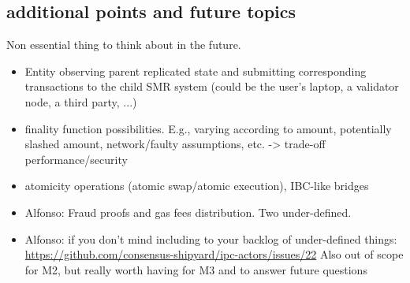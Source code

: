 \subsection{additional points and future topics}
Non essential thing to think about in the future.
\begin{itemize}
    \item Entity observing parent replicated state and submitting corresponding transactions to the child SMR system (could be the user's laptop, a validator node, a third party, ...)
    \item finality function possibilities. E.g., varying according to amount, potentially slashed amount, network/faulty assumptions, etc. -> trade-off performance/security
    \item atomicity operations (atomic swap/atomic execution), IBC-like bridges 
    \item Alfonso: Fraud proofs and gas fees distribution. Two under-defined.
    \item Alfonso: if you don't mind including to your backlog of under-defined things: \url{https://github.com/consensus-shipyard/ipc-actors/issues/22} Also out of scope for M2, but really worth having for M3 and to answer future questions
\end{itemize}

 
